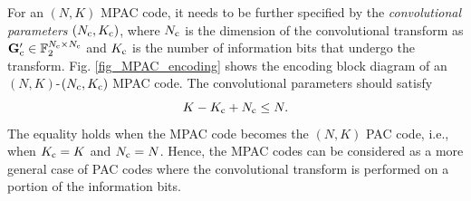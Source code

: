 \documentclass[12pt, draftclsnofoot, peerreview, onecolumn]{IEEEtran}
\theoremstyle{noparent}
\begin{document}
For an $(N, K)$ MPAC code, it needs to be further specified by the 
\textit{convolutional parameters} $(N_{\rm c},K_{\rm c})$, 
where $N_{\rm c}$ is the dimension of the convolutional transform as 
$\mathbf{G}^{\prime}_{\rm{c}} \in \mathbb{F}_{2}^{N_{\rm c} \times N_{\rm c}}$ and
$K_{\rm c}$ is the number of information bits that undergo the transform.
Fig. \ref{fig_MPAC_encoding} shows the encoding block diagram of an
$(N, K)$-$(N_{\rm c},K_{\rm c})$ MPAC code. 
The convolutional parameters should satisfy 
\begin{equation}
    K-K_{\rm c}+N_{\rm c}\leq N.
    \label{parameter_constraint}
\end{equation}
The equality holds when the MPAC code becomes the $(N, K)$ PAC code,
i.e., when $K_{\rm c}=K$ and $N_{\rm c}=N$. Hence, the MPAC codes can be considered as a more general case of PAC codes where the convolutional transform is performed on a portion of the information bits.
\end{document}
